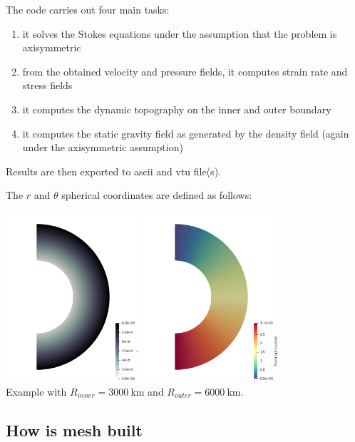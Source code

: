 The code carries out four main tasks:
\begin{enumerate}
\item it solves the Stokes equations under the assumption that the problem is axisymmetric
\item from the obtained velocity and pressure fields, it computes strain rate and stress fields
\item it computes the dynamic topography on the inner and outer boundary
\item it computes the static gravity field as generated by the density field (again under the 
axisymmetric assumption)
\end{enumerate}
Results are then exported to ascii and vtu file(s).

The $r$ and $\theta$ spherical coordinates are defined as follows:
\begin{center}
\includegraphics[width=5cm]{python_codes/fieldstone_96/images/radius}
\includegraphics[width=5cm]{python_codes/fieldstone_96/images/theta}\\
{\captionfont Example with $R_{inner}=3000~\si{\km}$ and $R_{outer}=6000~\si{\km}$.}
\end{center}

\subsection*{How is mesh built}

